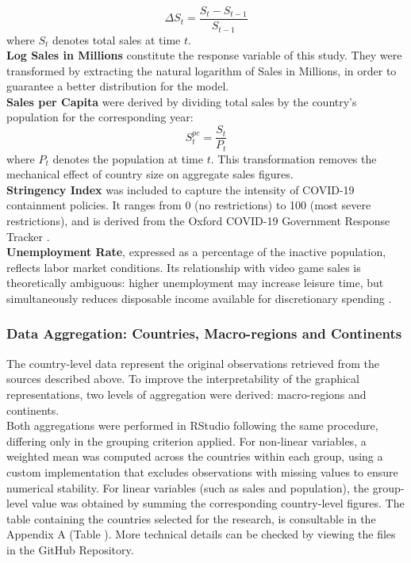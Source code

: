 \[
\Delta S_t = \frac{S_t - S_{t-1}}{S_{t-1}}
\]
where $S_t$ denotes total sales at time $t$.\\
\textbf{Log Sales in Millions} constitute the response variable of this study. They were transformed by extracting the 
natural logarithm of Sales in Millions, in order to guarantee a 
better distribution for the model.\\
\textbf{Sales per Capita} were derived by dividing total sales by the 
country's population for the corresponding year:
\[
S_t^{pc} = \frac{S_t}{P_t}
\]
where $P_t$ denotes the population at time $t$. This transformation 
removes the mechanical effect of country size on aggregate sales figures.\\
\textbf{Stringency Index} was included to capture the intensity of 
COVID-19 containment policies. It ranges from 0 (no restrictions) to 
100 (most severe restrictions), and is derived from the Oxford 
COVID-19 Government Response Tracker \citep{hale2026oxcgrt}.\\
\textbf{Unemployment Rate}, expressed as a percentage of the inactive 
population, reflects labor market conditions. Its relationship with 
video game sales is theoretically ambiguous: higher unemployment may 
increase leisure time, but simultaneously reduces disposable income 
available for discretionary spending \citep{worldbank_unemployment_ilo}.


\subsubsection{Data Aggregation: Countries, Macro-regions and Continents}
The country-level data represent the original observations retrieved from 
the sources described above. To improve the interpretability of the 
graphical representations, two levels of aggregation were derived: 
macro-regions and continents.\\
Both aggregations were performed in RStudio following the same procedure, 
differing only in the grouping criterion applied. For non-linear variables, 
a weighted mean was computed across the countries within each group, using 
a custom implementation that excludes observations with missing values to 
ensure numerical stability. For linear variables (such as sales and 
population), the group-level value was obtained by summing the 
corresponding country-level figures.
The table containing the countries selected for the research, is consultable in the Appendix A (Table ).
More technical details can be checked by viewing the files in the GitHub Repository.
